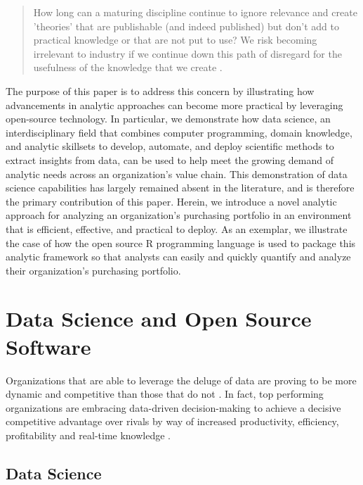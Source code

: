 \documentclass[twocolumn]{svjour3}       %
\begin{document}
\begin{quote}
How long can a maturing discipline continue to ignore relevance and create 'theories' that are publishable (and indeed published) but don't add to practical knowledge or that are not put to use? We risk becoming irrelevant to industry if we continue down this path of disregard for the usefulness of the knowledge that we create \citep{smbdel15}.
\end{quote}
The purpose of this paper is to address this concern by illustrating how advancements in analytic approaches can become more practical by leveraging open-source technology. In particular, we demonstrate how data science, an interdisciplinary field that combines computer programming, domain knowledge, and analytic skillsets to develop, automate, and deploy scientific methods to extract insights from data, can be used to help meet the growing demand of analytic needs across an organization's value chain. This demonstration of data science capabilities has largely remained absent in the literature, and is therefore the primary contribution of this paper.   Herein, we introduce a novel analytic approach for analyzing an organization's purchasing portfolio in an environment that is efficient, effective, and practical to deploy.  As an exemplar, we illustrate the case of how the open source R programming language is used to package this analytic framework so that analysts can easily and quickly quantify and analyze their organization's purchasing portfolio.  


\section{Data Science and Open Source Software}
\label{sec:2}

Organizations that are able to leverage the deluge of data are proving to be more dynamic and competitive than those that do not \citep{mb12}.  In fact, top performing organizations are embracing data-driven decision-making \citep{mb12} to achieve a decisive competitive advantage over rivals by way of increased productivity, efficiency, profitability and real-time knowledge \citep{tmdl10,mcbbdr}.  


\subsection{Data Science}
\label{sec:2.1}
\end{document}
